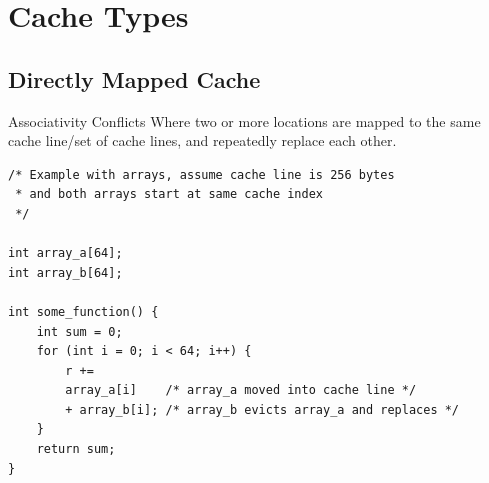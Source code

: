 \section{Cache Types}
\subsection{Directly Mapped Cache}
\begin{definitionbox}{Associativity Conflicts}
	Where two or more locations are mapped to the same cache line/set of cache lines, and repeatedly replace each other.
	\begin{verbatim}
/* Example with arrays, assume cache line is 256 bytes
 * and both arrays start at same cache index 
 */

int array_a[64];
int array_b[64];

int some_function() {
    int sum = 0;
    for (int i = 0; i < 64; i++) {
        r += 
        array_a[i]    /* array_a moved into cache line */
        + array_b[i]; /* array_b evicts array_a and replaces */
    }
    return sum;
}
    \end{verbatim}
\end{definitionbox}

